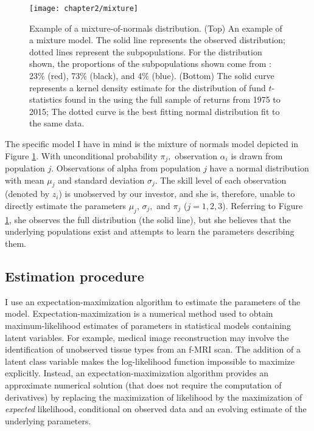 		\begin{figure}[p]
			\small
			\centering
			\texttt{[image: chapter2/mixture]}
			\captionsetup{skip=-20pt, font=footnotesize, justification=justified, width=\textwidth}
			\caption[Example of a mixture-of-normals distribution]{Example of a mixture-of-normals distribution. (Top) An example of a mixture model. The solid line represents the observed distribution; dotted lines represent the subpopulations. For the distribution shown, the proportions of the subpopulations shown come from \citet{Barras2010}: 23\% (red), 73\% (black), and 4\% (blue). (Bottom) The solid curve represents a kernel density estimate for the distribution of fund $t$-statistics found in the using the full sample of returns from 1975 to 2015; The dotted curve is the best fitting normal distribution fit to the same data.}
			\label{fig:mixture}
		\end{figure}

		The specific model I have in mind is the mixture of normals model depicted in Figure \ref{fig:mixture}. With unconditional probability $\pi_j,$ observation $\alpha_i$ is drawn from population $j$. Observations of alpha from population $j$ have a normal distribution with mean $\mu_j$ and standard deviation $\sigma_j$.  The skill level of each observation (denoted by $z_i$) is unobserved by our investor, and she is, therefore, unable to directly estimate the parameters $\mu_j$, $\sigma_j,$ and $\pi_j$ ($j=1,2,3$).  Referring to Figure \ref{fig:mixture}, she observes the full distribution (the solid line), but she believes that the underlying populations exist and attempts to learn the parameters describing them.

	\subsection{Estimation procedure}
		I use an expectation-maximization algorithm to estimate the parameters of the model. Expectation-maximization is a numerical method used to obtain maximum-likelihood estimates of parameters in statistical models containing latent variables. For example, medical image reconstruction may involve the identification of unobserved tissue types from an f-MRI scan.  The addition of a latent class variable makes the log-likelihood function impossible to maximize explicitly.  Instead, an expectation-maximization algorithm provides an approximate numerical solution (that does not require the computation of derivatives) by replacing the maximization of likelihood by the maximization of \textit{expected} likelihood, conditional on observed data and an evolving estimate of the underlying parameters.

